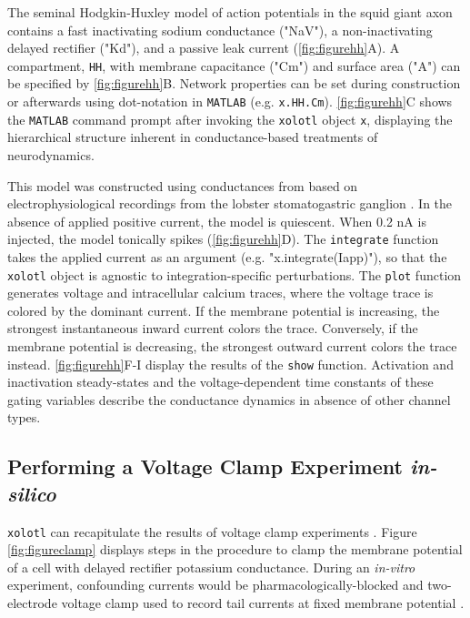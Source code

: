\documentclass{frontiersSCNS} %
\begin{document}
The seminal Hodgkin-Huxley model of action potentials in the squid giant axon \autocite{hodgkinComponentsMembraneConductance1952, hodgkinMeasurementCurrentvoltageRelations1952} contains a fast inactivating sodium conductance ("NaV"), a non-inactivating delayed rectifier ("Kd"), and a passive leak current (\ref{fig:figurehh}A). A compartment, \texttt{HH}, with membrane capacitance ("Cm") and surface area ("A") can be specified by \ref{fig:figurehh}B. Network properties can be set during construction or afterwards using dot-notation in \texttt{MATLAB} (e.g. \texttt{x.HH.Cm}). \ref{fig:figurehh}C shows the \texttt{MATLAB} command prompt after invoking the \texttt{xolotl} object \texttt{x}, displaying the hierarchical structure inherent in conductance-based treatments of neurodynamics.

This model was constructed using conductances from \cite{liuModelNeuronActivitydependent1998} based on electrophysiological recordings from the lobster stomatogastric ganglion \autocite{turrigianoSelectiveRegulationCurrent1995}. In the absence of applied positive current, the model is quiescent. When 0.2 nA is injected, the model tonically spikes (\ref{fig:figurehh}D). The \texttt{integrate} function takes the applied current as an argument (e.g. "x.integrate(Iapp)"), so that the \texttt{xolotl} object is agnostic to integration-specific perturbations. The \texttt{plot} function generates voltage and intracellular calcium traces, where the voltage trace is colored by the dominant current. If the membrane potential is increasing, the strongest instantaneous inward current colors the trace. Conversely, if the membrane potential is decreasing, the strongest outward current colors the trace instead. \ref{fig:figurehh}F-I display the results of the \texttt{show} function. Activation and inactivation steady-states and the voltage-dependent time constants of these gating variables describe the conductance dynamics in absence of other channel types.

%
%
%
%
%
%

\subsection{Performing a Voltage Clamp Experiment \textit{in-silico}}

\texttt{xolotl} can recapitulate the results of voltage clamp experiments \autocite{turrigianoSelectiveRegulationCurrent1995, swensenMultiplePeptidesConverge2000, swensenModulatorsConvergentCellular2001, destexheDynamicClampPrinciplesApplications2009}. Figure \ref{fig:figureclamp} displays steps in the procedure to clamp the membrane potential of a cell with delayed rectifier potassium conductance. During an \textit{in-vitro} experiment, confounding currents would be pharmacologically-blocked and two-electrode voltage clamp used to record tail currents at fixed membrane potential \autocite{connorInwardDelayedOutward1971, connorVoltageClampStudies1971}.
\end{document}
